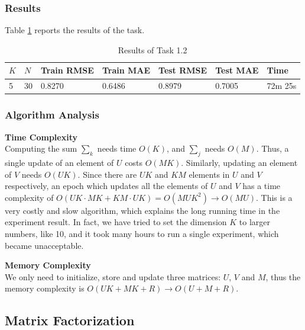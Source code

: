 \documentclass{article}
\begin{document}
\subsubsection{Results}
Table \ref{tab:1.2-re} reports the results of the task.
\begin{table}[ht]
    \centering
    \caption{Results of Task 1.2}
    \label{tab:1.2-re}
    \begin{tabular}{lllllll}
        \toprule
        \textbf{$K$} & \textbf{$N$} & \textbf{Train RMSE} & \textbf{Train MAE} & \textbf{Test RMSE} & \textbf{Test MAE} & \textbf{Time}\\
        \midrule
        5 & 30 & 0.8270 & 0.6486 & 0.8979 & 0.7005 & 72m 25s\\
        \bottomrule
    \end{tabular}
\end{table}

\subsubsection{Algorithm Analysis}
\noindent\textbf{Time Complexity}\\
Computing the sum $\sum_{k}$ needs time $O(K)$, and $\sum_j$ needs $O(M)$. Thus, a single update of an element of $U$ costs $O(MK)$. Similarly, updating an element of $V$ needs $O(UK)$. Since there are $UK$ and $KM$ elements in $U$ and $V$ respectively, an epoch which updates all the elements of $U$ and $V$ has a time complexity of $O(UK\cdot MK+KM\cdot UK)=O(MUK^2)\rightarrow O(MU)$. This is a very costly and slow algorithm, which explains the long running time in the experiment result. In fact, we have tried to set the dimension $K$ to larger numbers, like 10, and it took many hours to run a single experiment, which became unacceptable.

\vspace{0.3cm}
\noindent\textbf{Memory Complexity}\\
We only need to initialize, store and update three matrices: $U$, $V$ and $M$, thus the memory complexity is $O(UK+MK+R)\rightarrow O(U+M+R)$.

\subsection{Matrix Factorization}
\end{document}
